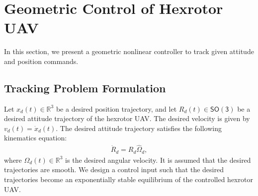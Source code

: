 \documentclass[twocolumn,letterpaper]{IEEEAerospaceCLS}  %
\newcommand{\SO}{\ensuremath{\mathsf{SO(3)}}}
\renewcommand{\Re}{\mathbb{R}}
\newcommand{\EditTL}[1]{{\color{blue}\protect #1}}
\begin{document}
\begin{figure}
{%
}\label{fig:hoverRegions}
\end{figure}



\section{Geometric Control of Hexrotor UAV}\label{sec:Control}

In this section, we present a geometric nonlinear controller to track given attitude and position commands. 

	
\subsection{Tracking Problem Formulation}

Let $x_d(t)\in{\Re}^3$ be a desired position trajectory, and let $R_d(t)\in\SO$ be a desired attitude trajectory of the hexrotor UAV. The desired velocity is given by $v_d(t)=\dot x_d(t)$. The desired attitude trajectory satisfies the following kinematics equation:
\begin{align}
\dot R_d = R_d \hat\Omega_d,\label{eqn:Rddot}
\end{align}
where $\Omega_d(t)\in{\Re}^3$ is the desired angular velocity. It is assumed that the desired trajectories are smooth. We design a control input such that the desired trajectories become an exponentially stable equilibrium of the controlled hexrotor UAV. 

		
\end{document}
